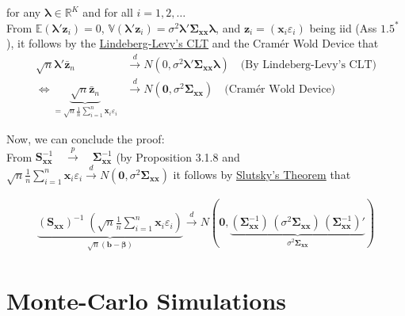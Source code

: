 \documentclass[]{book}
\theoremstyle{definition}
\theoremstyle{definition}
\theoremstyle{definition}
\theoremstyle{remark}
\begin{document}
for any \(\boldsymbol{\lambda}\in\mathbb{R}^{K}\) and for all
\(i=1,2,\dots\)\\
From \(\mathbb{E}(\boldsymbol{\lambda}'\mathbf{z}_i)=0\),
\(\mathbb{V}(\boldsymbol{\lambda}'\mathbf{z}_i)=\sigma^2\boldsymbol{\lambda}'\boldsymbol{\Sigma}_{\mathbf{x}\mathbf{x}}\boldsymbol{\lambda}\),
and \(\mathbf{z}_i=(\mathbf{x}_i\varepsilon_i)\) being iid (Ass
\(1.5^\ast\)), it follows by the \href{https://www.statlect.com/asymptotic-theory/central-limit-theorem}{Lindeberg-Levy's CLT}
and the Cramér Wold Device that \[\begin{align*}
\sqrt{n}\boldsymbol{\lambda}'\bar{\mathbf{z}}_n&\overset{d}\longrightarrow N(0,\sigma^2\boldsymbol{\lambda}'\boldsymbol{\Sigma}_{\mathbf{x}\mathbf{x}}\boldsymbol{\lambda})\quad\text{(By Lindeberg-Levy's CLT)}\\
\Leftrightarrow
\underbrace{\sqrt{n}\bar{\mathbf{z}}_n}_{=\sqrt{n}\frac{1}{n}\sum_{i=1}^n\mathbf{x}_i\varepsilon_i}&\overset{d}\longrightarrow N(\mathbf{0},\sigma^2\boldsymbol{\Sigma}_{\mathbf{x}\mathbf{x}})\quad\text{(Cramér Wold Device)}\end{align*}\]

Now, we can conclude the proof:\\
From
\(\mathbf{S}_{\mathbf{x}\mathbf{x}}^{-1}\quad\overset{p}\longrightarrow \quad\boldsymbol{\Sigma}_{\mathbf{x}\mathbf{x}}^{-1}\)
(by Proposition 3.1.8 and\\
\(\sqrt{n}\frac{1}{n}\sum_{i=1}^n\mathbf{x}_i\varepsilon_i\overset{d}\longrightarrow N(\mathbf{0},\sigma^2\boldsymbol{\Sigma}_{\mathbf{x}\mathbf{x}})\)
it follows by \href{https://www.statlect.com/asymptotic-theory/Slutsky-theorem}{Slutsky's Theorem}
that

\begin{align*}
\underbrace{\left(\mathbf{S}_{\mathbf{x}\mathbf{x}}\right)^{-1}\;\left(\sqrt{n}\frac{1}{n}\sum_{i=1}^n\mathbf{x}_i\varepsilon_i\right)}_{\sqrt{n}(\mathbf{b}-\boldsymbol{\beta})}\overset{d}\longrightarrow N\left(\mathbf{0},\underbrace{(\boldsymbol{\Sigma}_{\mathbf{x}\mathbf{x}}^{-1})\,(\sigma^2\boldsymbol{\Sigma}_{\mathbf{x}\mathbf{x}})\,(\boldsymbol{\Sigma}_{\mathbf{x}\mathbf{x}}^{-1})'}_{\sigma^2\boldsymbol{\Sigma}_{\mathbf{x}\mathbf{x}}}\right)
\end{align*}

\hypertarget{monte-carlo-simulations}{%
\chapter{Monte-Carlo Simulations}\label{monte-carlo-simulations}}
\end{document}
